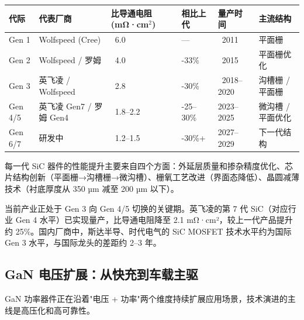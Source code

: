 \begin{exhibitbox}
\centering
\small
\setlength{\tabcolsep}{4pt}
\begin{tabularx}{\textwidth}{C{1.2cm} L{2.2cm} C{2.5cm} C{2cm} C{2.2cm} X}
\toprule
\textbf{代际} & \textbf{代表厂商} & \textbf{比导通电阻 (mΩ·cm$^2$)} & \textbf{相比上代} & \textbf{量产时间} & \textbf{主流结构} \\
\midrule
Gen 1 & Wolfspeed (Cree) & ~6.0 & — & ~2011 & 平面栅 \\
Gen 2 & Wolfspeed / 罗姆 & ~4.0 & -33\% & ~2015 & 平面栅优化 \\
Gen 3 & 英飞凌 / Wolfspeed & ~2.8 & -30\% & ~2018–2020 & 沟槽栅 / 平面栅 \\
Gen 4/5 & 英飞凌 Gen7 / 罗姆 Gen4 & ~1.8–2.2 & -25–30\% & 2023–2025 & 微沟槽 / 平面优化 \\
Gen 6/7 & 研发中 & ~1.2–1.5 & -30\%+ & 2027–2029 & 下一代结构 \\
\bottomrule
\end{tabularx}
\end{exhibitbox}

每一代 SiC 器件的性能提升主要来自四个方面：外延层质量和掺杂精度优化、芯片结构创新（平面栅→沟槽栅→微沟槽）、栅氧工艺改进（界面态降低）、晶圆减薄技术（衬底厚度从 350 µm 减至 200 µm 以下）。

当前产业正处于 Gen 3 向 Gen 4/5 切换的关键期。英飞凌的第 7 代 SiC（对应行业 Gen 4 水平）已实现量产，比导通电阻降至 2.1 mΩ·cm²，较上一代产品提升约 25\%。国内厂商中，斯达半导、时代电气的 SiC MOSFET 技术水平约为国际 Gen 3 水平，与国际龙头的差距约 2–3 年。

\subsection{GaN 电压扩展：从快充到车载主驱}

GaN 功率器件正在沿着"电压 + 功率"两个维度持续扩展应用场景，技术演进的主线是高压化和高可靠性。

